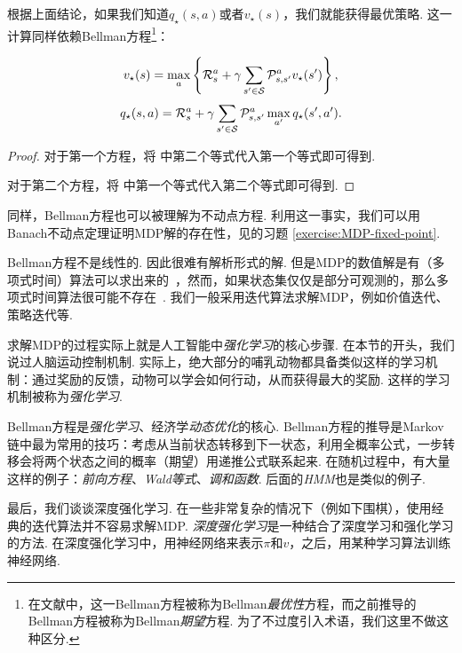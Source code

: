 根据上面结论，如果我们知道$q_\star(s,a)$或者$v_\star(s)$，我们就能获得最优策略. 这一计算同样依赖Bellman方程\footnote{在文献中，这一Bellman方程被称为Bellman\textit{最优性}方程，而之前推导的Bellman方程被称为Bellman\textit{期望}方程. 为了不过度引入术语，我们这里不做这种区分. }：

\begin{theorem}[Bellman方程]
\[v_\star(s) = \max_a\left\{\mathcal R_s^a + \gamma \sum_{s'\in \mathcal S}\mathcal P_{s,s'}^av_\star(s')\right\},\]
\[q_\star(s,a) = \mathcal R_s^a+\gamma \sum_{s'\in \mathcal S}\mathcal P_{s,s'}^a\max_{a'}q_\star(s',a').\]
\end{theorem}
\begin{proof}
    对于第一个方程，将 中第二个等式代入第一个等式即可得到. 

    对于第二个方程，将 中第一个等式代入第二个等式即可得到. 
\end{proof}

同样，Bellman方程也可以被理解为不动点方程. 利用这一事实，我们可以用Banach不动点定理证明MDP解的存在性，见的习题 \ref{exercise:MDP-fixed-point}.

Bellman方程不是线性的. 因此很难有解析形式的解. 但是MDP的数值解是有（多项式时间）算法可以求出来的~\cite{papadimitriouComplexityMarkovDecision1987,littmanComplexitySolvingMarkov1995}，然而，如果状态集仅仅是部分可观测的，那么多项式时间算法很可能不存在~\cite{papadimitriouComplexityMarkovDecision1987}. 我们一般采用迭代算法求解MDP，例如价值迭代、策略迭代等.


求解MDP的过程实际上就是人工智能中\textit{强化学习}的核心步骤. 在本节的开头，我们说过人脑运动控制机制. 实际上，绝大部分的哺乳动物都具备类似这样的学习机制：通过奖励的反馈，动物可以学会如何行动，从而获得最大的奖励. 这样的学习机制被称为\textit{强化学习}. 

\begin{remark}
Bellman方程是\textit{强化学习}、经济学\textit{动态优化}的核心. Bellman方程的推导是Markov链中最为常用的技巧：考虑从当前状态转移到下一状态，利用全概率公式，一步转移会将两个状态之间的概率（期望）用递推公式联系起来. 在随机过程中，有大量这样的例子：\textit{前向方程}、\textit{Wald等式}、\textit{调和函数}. 后面的\textit{HMM}也是类似的例子.    
\end{remark}

最后，我们谈谈深度强化学习. 在一些非常复杂的情况下（例如下围棋），使用经典的迭代算法并不容易求解MDP. \textit{深度强化学习}是一种结合了深度学习和强化学习的方法. 在深度强化学习中，用神经网络来表示$\pi$和$v$，之后，用某种学习算法训练神经网络. 


